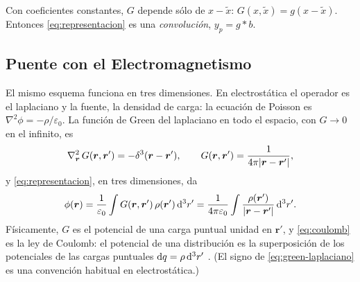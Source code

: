 \begin{observacion}\label{obs:convolucion}
Con coeficientes constantes, $G$ depende sólo de $x-\tilde x$:
$G(x,\tilde x)=g(x-\tilde x)$. Entonces \eqref{eq:representacion} es una
\emph{convolución}, $y_p=g*b$.
\end{observacion}

\subsection{Puente con el Electromagnetismo}\label{sec:poisson}
El mismo esquema funciona en tres dimensiones. En electrostática el
operador es el laplaciano y la fuente, la densidad de carga: la ecuación de
Poisson es $\nabla^{2}\phi=-\rho/\varepsilon_0$. La función de Green del
laplaciano en todo el espacio, con $G\to0$ en el infinito, es
\begin{equation}\label{eq:green-laplaciano}
  \nabla_{\bm r}^{2}\,G(\bm r,\bm r')=-\delta^{3}(\bm r-\bm r'),
  \qquad
  G(\bm r,\bm r')=\frac{1}{4\pi\lvert \bm r-\bm r'\rvert},
\end{equation}
y \eqref{eq:representacion}, en tres dimensiones, da
\begin{equation}\label{eq:coulomb}
  \phi(\bm r)=\frac1{\varepsilon_0}\int G(\bm r,\bm r')\,\rho(\bm r')\,\mathrm{d}^{3}r'
            =\frac{1}{4\pi\varepsilon_0}\int\frac{\rho(\bm r')}{\lvert \bm r-\bm r'\rvert}\,\mathrm{d}^{3}r' .
\end{equation}
Físicamente, $G$ es el potencial de una carga puntual unidad en $\bm r'$, y
\eqref{eq:coulomb} es la ley de Coulomb: el potencial de una distribución
es la superposición de los potenciales de las cargas puntuales
$\mathrm{d} q=\rho\,\mathrm{d}^{3}r'$ \cite[§2.3]{GRIFFITHS}. (El signo de
\eqref{eq:green-laplaciano} es una convención habitual en electrostática.)
